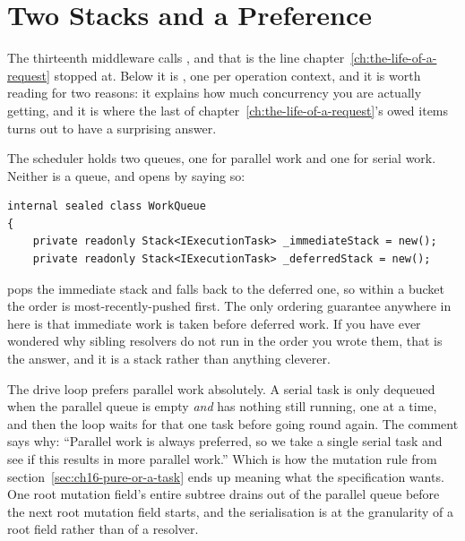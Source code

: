 \section{Two Stacks and a Preference}
\label{sec:ch16-two-stacks}
%

The thirteenth middleware calls , and that is
the line chapter~\ref{ch:the-life-of-a-request} stopped at. Below it is
, one per operation context, and it is worth reading for two
reasons: it explains how much concurrency you are actually getting, and it is
where the last of chapter~\ref{ch:the-life-of-a-request}'s owed items turns out
to have a surprising answer.

%
The scheduler holds two queues, one for parallel work and one for serial work.
Neither is a queue, and  opens by saying so:

\begin{verbatim}
internal sealed class WorkQueue
{
    private readonly Stack<IExecutionTask> _immediateStack = new();
    private readonly Stack<IExecutionTask> _deferredStack = new();
\end{verbatim}

 pops the immediate stack and falls back to the deferred one, so
within a bucket the order is most-recently-pushed first. The only ordering
guarantee anywhere in here is that immediate work is taken before deferred work.
If you have ever wondered why sibling resolvers do not run in the order you
wrote them, that is the answer, and it is a stack rather than anything cleverer.

%
The drive loop prefers parallel work absolutely. A serial task is only dequeued
when the parallel queue is empty \emph{and} has nothing still running, one at a
time, and then the loop waits for that one task before going round again. The
comment says why: \enquote{Parallel work is always preferred, so we take a
single serial task and see if this results in more parallel work.} Which is how
the mutation rule from section~\ref{sec:ch16-pure-or-a-task} ends up meaning
what the specification wants. One root mutation field's entire subtree drains
out of the parallel queue before the next root mutation field starts, and the
serialisation is at the granularity of a root field rather than of a resolver.

